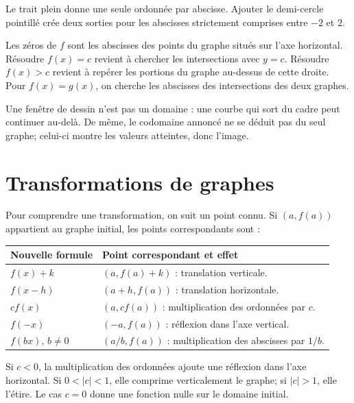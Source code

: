 Le trait plein donne une seule ordonnée par abscisse. Ajouter le demi-cercle pointillé crée deux sorties pour les abscisses strictement comprises entre \(-2\) et \(2\).

\begin{methodbox}[title={Lire une équation sur un graphe}]
Les zéros de \(f\) sont les abscisses des points du graphe situés sur l'axe horizontal. Résoudre \(f(x)=c\) revient à chercher les intersections avec \(y=c\). Résoudre \(f(x)>c\) revient à repérer les portions du graphe au-dessus de cette droite. Pour \(f(x)=g(x)\), on cherche les abscisses des intersections des deux graphes.
\end{methodbox}

Une fenêtre de dessin n'est pas un domaine : une courbe qui sort du cadre peut continuer au-delà. De même, le codomaine annoncé ne se déduit pas du seul graphe; celui-ci montre les valeurs atteintes, donc l'image.

\section{Transformations de graphes}
\label{manual:section:03.03}

Pour comprendre une transformation, on suit un point connu. Si \((a,f(a))\) appartient au graphe initial, les points correspondants sont :

\begin{center}
\begin{tabularx}{\linewidth}{@{}lY@{}}
\toprule
Nouvelle formule & Point correspondant et effet \\
\midrule
\(f(x)+k\) & \((a,f(a)+k)\) : translation verticale. \\
\(f(x-h)\) & \((a+h,f(a))\) : translation horizontale. \\
\(cf(x)\) & \((a,cf(a))\) : multiplication des ordonnées par \(c\). \\
\(f(-x)\) & \((-a,f(a))\) : réflexion dans l'axe vertical. \\
\(f(bx)\), \(b\ne0\) & \((a/b,f(a))\) : multiplication des abscisses par \(1/b\). \\
\bottomrule
\end{tabularx}
\end{center}

Si \(c<0\), la multiplication des ordonnées ajoute une réflexion dans l'axe horizontal. Si \(0<|c|<1\), elle comprime verticalement le graphe; si \(|c|>1\), elle l'étire. Le cas \(c=0\) donne une fonction nulle sur le domaine initial.

